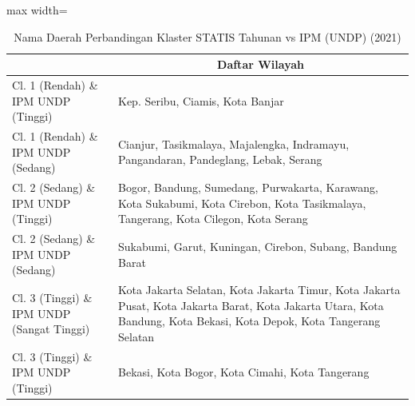 \begin{table}[H]
\centering
\caption{Nama Daerah Perbandingan Klaster STATIS Tahunan vs IPM (UNDP) (2021)} \label{tab:app1statis_ipm_name_2021}
\begin{adjustbox}{max width=\textwidth}
\begin{tabular}{|>{\centering\arraybackslash}p{4cm}|p{10cm}|}
\hline
\multicolumn{1}{|c|}{\textbf{Kategori}} & \multicolumn{1}{c|}{\textbf{Daftar Wilayah}} \\
\hline
Cl. 1 (Rendah) \& IPM UNDP (Tinggi) & Kep. Seribu, Ciamis, Kota Banjar \\
\hline
Cl. 1 (Rendah) \& IPM UNDP (Sedang) & Cianjur, Tasikmalaya, Majalengka, Indramayu, Pangandaran, Pandeglang, Lebak, Serang \\
\hline
Cl. 2 (Sedang) \& IPM UNDP (Tinggi) & Bogor, Bandung, Sumedang, Purwakarta, Karawang, Kota Sukabumi, Kota Cirebon, Kota Tasikmalaya, Tangerang, Kota Cilegon, Kota Serang \\
\hline
Cl. 2 (Sedang) \& IPM UNDP (Sedang) & Sukabumi, Garut, Kuningan, Cirebon, Subang, Bandung Barat \\
\hline
Cl. 3 (Tinggi) \& IPM UNDP (Sangat Tinggi) & Kota Jakarta Selatan, Kota Jakarta Timur, Kota Jakarta Pusat, Kota Jakarta Barat, Kota Jakarta Utara, Kota Bandung, Kota Bekasi, Kota Depok, Kota Tangerang Selatan \\
\hline
Cl. 3 (Tinggi) \& IPM UNDP (Tinggi) & Bekasi, Kota Bogor, Kota Cimahi, Kota Tangerang \\
\hline
\end{tabular}
\end{adjustbox}
\end{table}